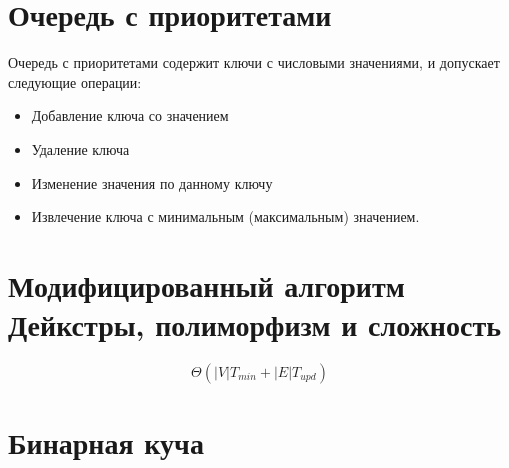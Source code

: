 \documentclass[24pt,pdf,hyperref={unicode},aspectratio=169]{beamer}
\begin{document}
\section{Очередь с приоритетами}

\begin{frame}
Очередь с приоритетами содержит ключи с числовыми значениями, и допускает следующие операции: 
\begin{itemize}
\item Добавление ключа со значением
\item Удаление ключа 
\item Изменение значения по данному ключу
\item Извлечение ключа с минимальным (максимальным) значением.
\end{itemize}
\end{frame}

\section{Модифицированный алгоритм Дейкстры, полиморфизм и сложность}

\begin{frame}
\begin{huge}
$$
\Theta\left(|V|T_{min} + |E|T_{upd}\right)
$$
\end{huge}
\end{frame}

\section{Бинарная куча}
\end{document}
